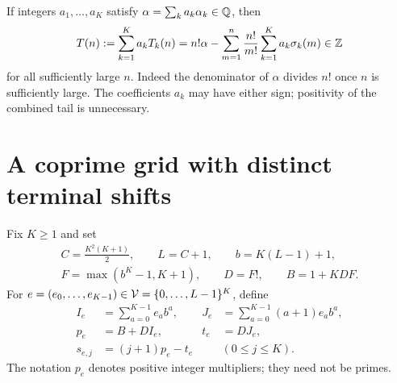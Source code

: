 If integers $a_1,\ldots,a_K$ satisfy
$\alpha=\sum_k a_k\alpha_k\in\mathbb Q$, then
\begin{equation}\label{eq:integral}
 T(n):=\sum_{k=1}^{K}a_kT_k(n)
 =n!\alpha-\sum_{m=1}^{n}\frac{n!}{m!}
                         \sum_{k=1}^{K}a_k\sigma_k(m)
 \in\mathbb Z
\end{equation}
for all sufficiently large $n$. Indeed the denominator of $\alpha$
divides $n!$ once $n$ is sufficiently large. The coefficients $a_k$
may have either sign; positivity of the combined tail is unnecessary.

\section{A coprime grid with distinct terminal shifts}
Fix $K\geq1$ and set
\begin{equation}\label{eq:gridconstants}
\begin{gathered}
 C=\frac{K^2(K+1)}2,\qquad L=C+1,\qquad b=K(L-1)+1,\\
 F=\max(b^K-1,K+1),\qquad D=F!,\qquad B=1+KDF.
\end{gathered}
\end{equation}
For $e=(e_0,\ldots,e_{K-1})\in\mathcal V=\{0,\ldots,L-1\}^K$, define
\begin{align}\label{eq:grid}
 I_e&=\sum_{a=0}^{K-1}e_ab^a,&
 J_e&=\sum_{a=0}^{K-1}(a+1)e_ab^a,\\
 p_e&=B+DI_e,&t_e&=DJ_e,\nonumber\\
 s_{e,j}&=(j+1)p_e-t_e&& (0\leq j\leq K).\nonumber
\end{align}
The notation $p_e$ denotes positive integer multipliers; they need not
be primes.

